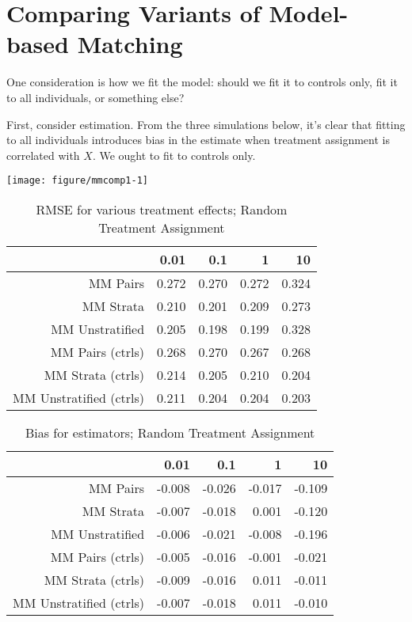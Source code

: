 \documentclass[11pt]{article}\usepackage[]{graphicx}\usepackage[]{color}
\makeatletter
\def\maxwidth{ %
  \ifdim\Gin@nat@width>\linewidth
    \linewidth
  \else
    \Gin@nat@width
  \fi
}
\newenvironment{knitrout}{}{} %
\makeatother
\begin{document}
\section{Comparing Variants of Model-based Matching}
One consideration is how we fit the model: should we fit it to controls only, fit it to all individuals, or something else?

First, consider estimation.  From the three simulations below, it's clear that fitting to all individuals introduces bias in the estimate when treatment assignment is correlated with $X$.  We ought to fit to controls only.



\begin{knitrout}
\color{fgcolor}

{\centering \texttt{[image: figure/mmcomp1-1]} 

}



\end{knitrout}

\begin{table}[ht]
\centering
\begin{tabular}{rrrrr}
  \hline
 & 0.01 & 0.1 & 1 & 10 \\ 
  \hline
MM Pairs & 0.272 & 0.270 & 0.272 & 0.324 \\ 
  MM Strata & 0.210 & 0.201 & 0.209 & 0.273 \\ 
  MM Unstratified & 0.205 & 0.198 & 0.199 & 0.328 \\ 
  MM Pairs (ctrls) & 0.268 & 0.270 & 0.267 & 0.268 \\ 
  MM Strata (ctrls) & 0.214 & 0.205 & 0.210 & 0.204 \\ 
  MM Unstratified (ctrls) & 0.211 & 0.204 & 0.204 & 0.203 \\ 
   \hline
\end{tabular}
\caption{RMSE for various treatment effects; Random Treatment Assignment} 
\label{tab:mmcomp1}
\end{table}
\begin{table}[ht]
\centering
\begin{tabular}{rrrrr}
  \hline
 & 0.01 & 0.1 & 1 & 10 \\ 
  \hline
MM Pairs & -0.008 & -0.026 & -0.017 & -0.109 \\ 
  MM Strata & -0.007 & -0.018 & 0.001 & -0.120 \\ 
  MM Unstratified & -0.006 & -0.021 & -0.008 & -0.196 \\ 
  MM Pairs (ctrls) & -0.005 & -0.016 & -0.001 & -0.021 \\ 
  MM Strata (ctrls) & -0.009 & -0.016 & 0.011 & -0.011 \\ 
  MM Unstratified (ctrls) & -0.007 & -0.018 & 0.011 & -0.010 \\ 
   \hline
\end{tabular}
\caption{Bias for estimators; Random Treatment Assignment} 
\label{tab:mmcomp1}
\end{table}
\end{document}
